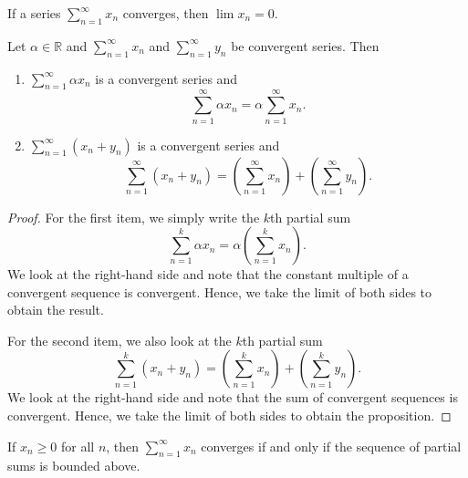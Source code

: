 \documentclass[../main.tex]{subfiles}
\begin{document}
    
    
    
    \begin{exercise}
    If a series $\sum_{n=1}^\infty{x_n}$ converges, then $\lim{x_n} = 0.$
    \end{exercise}
    
    
    
    
    
    
    \begin{proposition}\label{prp:linearity_series}
    Let $\alpha \in \mathbb{R}$ and $\sum_{n=1}^{\infty} x_n$ and $\sum_{n=1}^{\infty} y_n$ be convergent series. Then
    \begin{enumerate}
        \item $\sum_{n=1}^{\infty} \alpha x_n$ is a convergent series and
        \[
        \sum_{n=1}^{\infty} \alpha x_n = \alpha \sum_{n=1}^{\infty} x_n.
        \]
        \item $\sum_{n=1}^{\infty} (x_n + y_n)$ is a convergent series and
        \[
        \sum_{n=1}^{\infty} (x_n + y_n) = \left( \sum_{n=1}^{\infty} x_n \right) + \left( \sum_{n=1}^{\infty} y_n \right).
        \]
    \end{enumerate}
    
    \end{proposition}
    
    \begin{proof}
        
    For the first item, we simply write the $k$th partial sum
    \[
    \sum_{n=1}^{k} \alpha x_n = \alpha \left( \sum_{n=1}^{k} x_n \right).
    \]
    We look at the right-hand side and note that the constant multiple of a convergent sequence is convergent. Hence, we take the limit of both sides to obtain the result.
    
    For the second item, we also look at the $k$th partial sum
    \[
    \sum_{n=1}^{k} (x_n + y_n) = \left( \sum_{n=1}^{k} x_n \right) + \left( \sum_{n=1}^{k} y_n \right).
    \]
    We look at the right-hand side and note that the sum of convergent sequences is convergent. Hence, we take the limit of both sides to obtain the proposition.   
    \end{proof}
    
    
    
    \begin{proposition}
    If $x_n \geq 0$ for all $n$, then $\sum_{n=1}^{\infty} x_n$ converges if and only if the sequence of partial sums is bounded above.
    \end{proposition}
    
\end{document}
